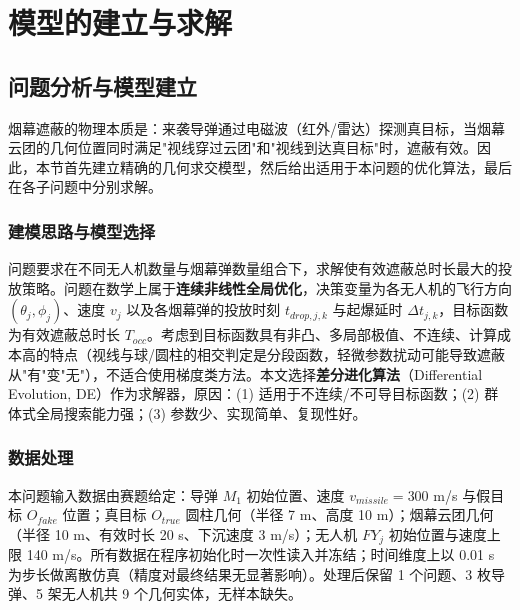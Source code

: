 \section{模型的建立与求解}
\subsection{问题分析与模型建立}


烟幕遮蔽的物理本质是：来袭导弹通过电磁波（红外/雷达）探测真目标，当烟幕云团的几何位置同时满足"视线穿过云团"和"视线到达真目标"时，遮蔽有效。因此，本节首先建立精确的几何求交模型，然后给出适用于本问题的优化算法，最后在各子问题中分别求解。

\subsubsection{建模思路与模型选择}

问题要求在不同无人机数量与烟幕弹数量组合下，求解使有效遮蔽总时长最大的投放策略。问题在数学上属于\textbf{连续非线性全局优化}，决策变量为各无人机的飞行方向 $(\theta_j, \phi_j)$、速度 $v_j$ 以及各烟幕弹的投放时刻 $t_{drop,j,k}$ 与起爆延时 $\Delta t_{j,k}$，目标函数为有效遮蔽总时长 $T_{occ}$。考虑到目标函数具有非凸、多局部极值、不连续、计算成本高的特点（视线与球/圆柱的相交判定是分段函数，轻微参数扰动可能导致遮蔽从"有"变"无"），不适合使用梯度类方法。本文选择\textbf{差分进化算法}（Differential Evolution, DE）作为求解器，原因：(1) 适用于不连续/不可导目标函数；(2) 群体式全局搜索能力强；(3) 参数少、实现简单、复现性好。

\subsubsection{数据处理}

本问题输入数据由赛题给定：导弹 $M_1$ 初始位置、速度 $v_{missile} = 300$ m/s 与假目标 $O_{fake}$ 位置；真目标 $O_{true}$ 圆柱几何（半径 7 m、高度 10 m）；烟幕云团几何（半径 10 m、有效时长 20 s、下沉速度 3 m/s）；无人机 $FY_j$ 初始位置与速度上限 140 m/s。所有数据在程序初始化时一次性读入并冻结；时间维度上以 0.01 s 为步长做离散仿真（精度对最终结果无显著影响）。处理后保留 1 个问题、3 枚导弹、5 架无人机共 9 个几何实体，无样本缺失。

